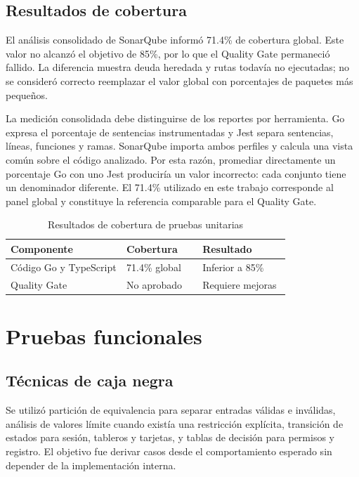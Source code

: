 \documentclass[conference]{IEEEtran}
\begin{document}
\subsection{Resultados de cobertura}
El análisis consolidado de SonarQube informó 71.4\% de cobertura global. Este valor no alcanzó el objetivo de 85\%, por lo que el Quality Gate permaneció fallido. La diferencia muestra deuda heredada y rutas todavía no ejecutadas; no se consideró correcto reemplazar el valor global con porcentajes de paquetes más pequeños.

La medición consolidada debe distinguirse de los reportes por herramienta. Go expresa el porcentaje de sentencias instrumentadas y Jest separa sentencias, líneas, funciones y ramas. SonarQube importa ambos perfiles y calcula una vista común sobre el código analizado. Por esta razón, promediar directamente un porcentaje Go con uno Jest produciría un valor incorrecto: cada conjunto tiene un denominador diferente. El 71.4\% utilizado en este trabajo corresponde al panel global y constituye la referencia comparable para el Quality Gate.

\begin{table}[htbp]
\caption{Resultados de cobertura de pruebas unitarias}
\label{tab:cobertura_unitaria}
\centering
\begin{tabular}{|p{0.33\linewidth}|p{0.21\linewidth}|p{0.25\linewidth}|}
\hline
\textbf{Componente} & \textbf{Cobertura} & \textbf{Resultado} \\
\hline
Código Go y TypeScript & 71.4\% global & Inferior a 85\% \\
\hline
Quality Gate & No aprobado & Requiere mejoras \\
\hline
\end{tabular}
\end{table}
\vspace{\baselineskip}

\section{Pruebas funcionales}

\subsection{Técnicas de caja negra}
Se utilizó partición de equivalencia para separar entradas válidas e inválidas, análisis de valores límite cuando existía una restricción explícita, transición de estados para sesión, tableros y tarjetas, y tablas de decisión para permisos y registro. El objetivo fue derivar casos desde el comportamiento esperado sin depender de la implementación interna.
\vspace{\baselineskip}
\end{document}
